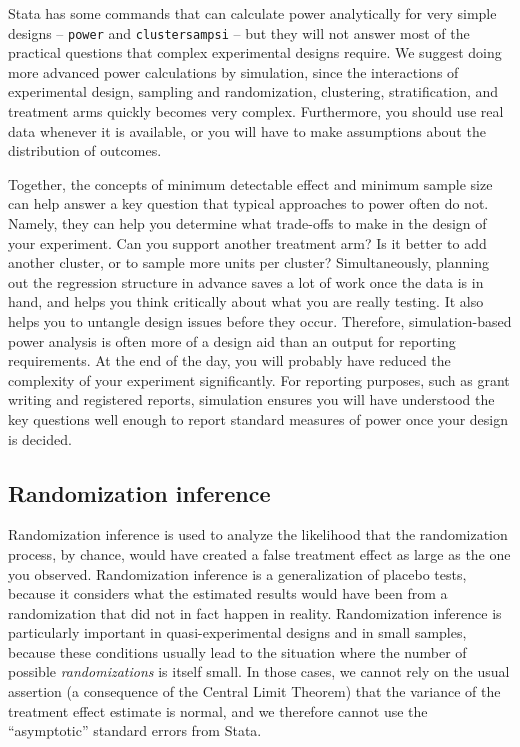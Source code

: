 Stata has some commands that can calculate power analytically for
very simple designs -- \texttt{power} and \texttt{clustersampsi} --
but they will not answer most of the practical questions
that complex experimental designs require.
We suggest doing more advanced power calculations by simulation,
since the interactions of experimental design,
sampling and randomization,
clustering, stratification, and treatment arms
quickly becomes very complex.
Furthermore, you should use real data whenever it is available,
or you will have to make assumptions about the distribution of outcomes.

Together, the concepts of minimum detectable effect
and minimum sample size can help answer a key question
that typical approaches to power often do not.
Namely, they can help you determine what trade-offs to make
in the design of your experiment.
Can you support another treatment arm?
Is it better to add another cluster,
or to sample more units per cluster?
Simultaneously, planning out the regression structure
in advance saves a lot of work once the data is in hand,
and helps you think critically about what you are really testing.
It also helps you to untangle design issues before they occur.
Therefore, simulation-based power analysis is often more of a design aid
than an output for reporting requirements.
At the end of the day, you will probably have reduced
the complexity of your experiment significantly.
For reporting purposes, such as grant writing and registered reports,
simulation ensures you will have understood the key questions well enough
to report standard measures of power once your design is decided.

\subsection{Randomization inference}

Randomization inference is used to analyze the likelihood
that the randomization process, by chance,
would have created a false treatment effect as large as the one you observed.
Randomization inference is a generalization of placebo tests,
because it considers what the estimated results would have been
from a randomization that did not in fact happen in reality.
Randomization inference is particularly important
in quasi-experimental designs and in small samples,
because these conditions usually lead to the situation
where the number of possible \textit{randomizations} is itself small.
In those cases, we cannot rely on the usual assertion
(a consequence of the Central Limit Theorem)
that the variance of the treatment effect estimate is normal,
and we therefore cannot use the ``asymptotic'' standard errors from Stata.


